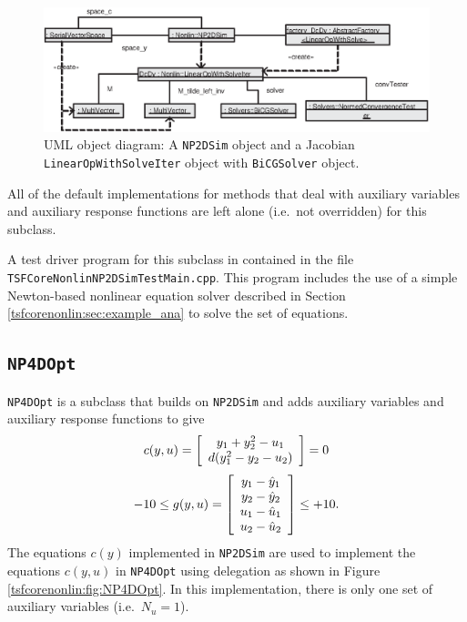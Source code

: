 %
{\bsinglespace
\begin{figure}
\begin{center}
\includegraphics*[bb= 0.0in 0.0in 5.9in 2.0in,angle=0,scale=0.70
]{NP2DSim_obj}
\end{center}
\caption{
\label{tsfcorenonlin:fig:NP2DSim_obj}
UML \cite{ref:booch_et_al_1999} object diagram: A \texttt{NP2DSim} object and a Jacobian
\texttt{Linear\-Op\-With\-Solve\-Iter} object with \texttt{BiCG\-Solver} object.
}
\end{figure}
\esinglespace}
%

All of the default implementations for methods that deal with
auxiliary variables and auxiliary response functions are left alone
(i.e.~not overridden) for this subclass.

A test driver program for this subclass in contained in the file
\texttt{TSFCore\-Nonlin\-NP2DSim\-Test\-Main.cpp}.  This program
includes the use of a simple Newton-based nonlinear equation solver
described in Section \ref{tsfcorenonlin:sec:example_ana} to solve the
set of equations.

%
\subsection{\texttt{NP4DOpt}}
%

\texttt{NP4DOpt} is a subclass that builds on \texttt{NP2DSim}
and adds auxiliary variables and auxiliary response functions
to give
%
\begin{equation}
c(y,u) = {\bmat{c} y_1 + y_2^2 - u_1 \\ d ( y_1^2 - y_2 - u_2 ) \emat} = 0
\label{tsfcorenonlin:equ:np4dopt_c}
\end{equation}
\begin{equation}
-10 \le g(y,u) = {\bmat{c} y_1 - \hat{y}_1 \\ y_2 - \hat{y}_2 \\ u_1 - \hat{u}_1 \\ u_2 - \hat{u}_2 \emat} \le +10.
\label{tsfcorenonlin:equ:np4dopt_g}
\end{equation}
%
The equations $c(y)$ implemented in \texttt{NP2DSim} are used to
implement the equations $c(y,u)$ in \texttt{NP4DOpt} using delegation
\cite{ref:gama_et_al_1995} as shown in Figure
\ref{tsfcorenonlin:fig:NP4DOpt}.  In this implementation, there
is only one set of auxiliary variables (i.e.~$N_u = 1$).

